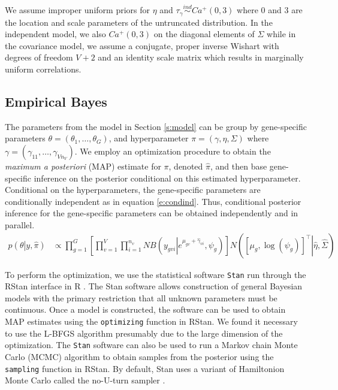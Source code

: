\documentclass[useAMS,usenatbib,referee]{biom}
\begin{document}
We assume improper uniform priors for $\eta$ and $\tau_\gamma\stackrel{ind}{\sim} Ca^+(0,3)$ where 0 and 3 are the location and scale parameters of the untruncated distribution. In the independent model, we also $Ca^+(0,3)$ on the diagonal elements of $\Sigma$ while in the covariance model, we assume a conjugate, proper inverse Wishart with degrees of freedom $V+2$ and an identity scale matrix which results in marginally uniform correlations. 

\subsection{Empirical Bayes}
\label{s:ebayes}

The parameters from the model in Section \ref{s:model} can be group by gene-specific parameters $\theta = (\theta_1,\ldots,\theta_G)$, and hyperparameter $\pi = (\gamma,\eta, \Sigma)$ where $\gamma = (\gamma_{11},\ldots,\gamma_{Vn_V})$. We employ an optimization procedure to obtain the \emph{maximum a posteriori} (MAP) estimate for $\pi$, denoted $\hat{\pi}$, and then base gene-specific inference on the posterior conditional on this estimated hyperparameter. Conditional on the hyperparameters, the gene-specific parameters are conditionally independent as in equation \eqref{e:condind}. Thus, conditional posterior inference for the gene-specific parameters can be obtained independently and in parallel.
\begin{align}
p\left(\theta\left|y,\hat{\pi}\right.\right) 
&\propto \prod_{g=1}^G \left[ \prod_{v=1}^V \prod_{i=1}^{n_v} NB\left(y_{gvi}\left|e^{\mu_{gv}+\hat{\gamma}_{vi}},\psi_g\right.\right) \right] N\left(\left.\left[\mu_g, \log(\psi_g) \right]^\top\right|\hat{\eta}, \hat{\Sigma} \right) 
\label{e:condind}
\end{align}


To perform the optimization, we use the statistical software {\tt Stan} \citep{stan-software:2014} run through the RStan interface \citep{rstan-software:2014} in R \citep{R2014}. The Stan software allows construction of general Bayesian models with the primary restriction that all unknown parameters must be continuous. Once a model is constructed, the software can be used to obtain MAP estimates \cite[Section 50.3,][]{stan-manual:2014} using the {\tt optimizing} function in RStan. We found it necessary to use the L-BFGS algorithm \cite[Section 55,][]{stan-manual:2014} presumably due to the large dimension of the optimization. The {\tt Stan} software can also be used to run a Markov chain Monte Carlo (MCMC) algorithm to obtain samples from the posterior using the {\tt sampling} function in RStan. By default, Stan uses a variant of Hamiltonion Monte Carlo \citep{neal2011mcmc} called the no-U-turn sampler \citep{hoffman2013no}. 
\end{document}
